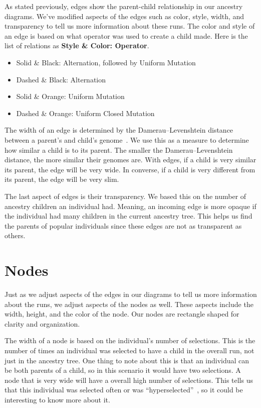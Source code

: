 \documentclass{sig-alternate}
\begin{document}
As stated previously, edges show the parent-child relationship in our ancestry diagrams. We've modified aspects of the edges such as color, style, width, and transparency to tell us more information about these runs. The color and style of an edge is based on what operator was used to create a child made. Here is the list of relations as \textbf{Style \& Color: Operator}.
\begin{itemize}
\setlength\itemsep{0em}
\item Solid \& Black: Alternation, followed by Uniform Mutation
\item Dashed \& Black: Alternation
\item Solid \& Orange: Uniform Mutation
\item Dashed \& Orange: Uniform Closed Mutation
\end{itemize}

The width of an edge is determined by the Damerau--Levenshtein distance between a parent's and child's genome~\cite{wiki:DLdist}. We use this as a measure to determine how similar a child is to its parent. The smaller the Damerau--Levenshtein distance, the more similar their genomes are. With edges, if a child is very similar its parent, the edge will be very wide. In converse, if a child is very different from its parent, the edge will be very slim.

The last aspect of edges is their transparency. We based this on the number of ancestry children an individual had. Meaning, an incoming edge is more opaque if the individual had many children in the current ancestry tree. This helps us find the parents of popular individuals since these edges are not as transparent as others.

\section{Nodes}
\label{sec:nodes}

Just as we adjust aspects of the edges in our diagrams to tell us more information about the runs, we adjust aspects of the nodes as well. These aspects include the width, height, and the color of the node. Our nodes are rectangle shaped for clarity and organization. 

The width of a node is based on the individual's number of selections. This is the number of times an individual was selected to have a child in the overall run, not just in the ancestry tree. One thing to note about this is that an individual can be both parents of a child, so in this scenario it would have two selections. A node that is very wide will have a overall high number of selections. This tells us that this individual was selected often or was ``hyperselected''~\cite{Helmuth:2016:GECCO}, so it could be interesting to know more about it. 
\end{document}
